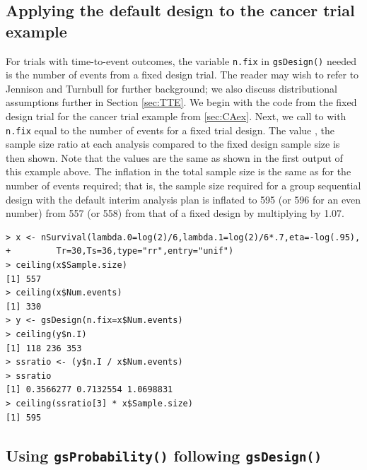\subsection{Applying the default design to the cancer trial example}
For trials with time-to-event outcomes, the variable \texttt{n.fix} in \texttt{gsDesign()} needed is the number of events from a fixed design trial. 
The reader may wish to refer to Jennison and Turnbull \cite{JTBook} for further background; we also discuss distributional assumptions further in Section \ref{sec:TTE}.
We begin with the code from the fixed design trial for the cancer trial example from \ref{sec:CAex}.
Next, we call to  with \texttt{n.fix} equal to the number of events for a fixed trial design. 
The value , the sample size ratio at each analysis compared to the fixed design sample size is then shown. Note that the values are the same as shown in the first output of this example above.
The inflation in the total sample size is the same as for the number of events required; that is, the sample size required for a group sequential design with the default interim analysis plan is inflated to 595 (or 596 for an even number) from 557 (or 558) from that of a fixed design by multiplying by 1.07. 

\begin{verbatim}
> x <- nSurvival(lambda.0=log(2)/6,lambda.1=log(2)/6*.7,eta=-log(.95),
+         Tr=30,Ts=36,type="rr",entry="unif")
> ceiling(x$Sample.size)
[1] 557
> ceiling(x$Num.events)
[1] 330
> y <- gsDesign(n.fix=x$Num.events)
> ceiling(y$n.I)
[1] 118 236 353
> ssratio <- (y$n.I / x$Num.events)
> ssratio
[1] 0.3566277 0.7132554 1.0698831
> ceiling(ssratio[3] * x$Sample.size)
[1] 595
\end{verbatim}

\subsection{Using \texttt{gsProbability()} following \texttt{gsDesign()}}

